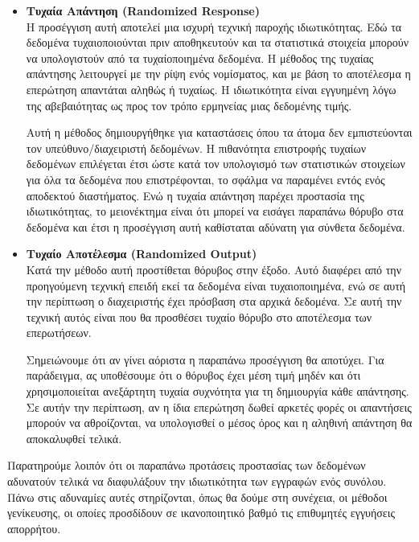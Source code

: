 \begin{itemize}
\item \textbf{Τυχαία Απάντηση (\textlatin{Randomized Response})}\\
Η προσέγγιση αυτή αποτελεί μια ισχυρή τεχνική παροχής ιδιωτικότητας. 
Εδώ τα δεδομένα τυχαιοποιούνται πριν αποθηκευτούν και τα στατιστικά στοιχεία μπορούν να υπολογιστούν από τα τυχαίοποιημένα δεδομένα. Η μέθοδος της τυχαίας απάντησης λειτουργεί με την ρίψη ενός νομίσματος, και με βάση το αποτέλεσμα η επερώτηση απαντάται αληθώς ή τυχαίως. Η ιδιωτικότητα είναι εγγυημένη λόγω της αβεβαιότητας ως προς τον τρόπο ερμηνείας μιας δεδομένης τιμής.

Αυτή η μέθοδος δημιουργήθηκε για καταστάσεις όπου τα άτομα δεν εμπιστεύονται τον υπεύθυνο/διαχειριστή δεδομένων. Η πιθανότητα επιστροφής τυχαίων δεδομένων επιλέγεται έτσι ώστε κατά τον υπολογισμό των στατιστικών στοιχείων για όλα τα δεδομένα που επιστρέφονται, το σφάλμα να παραμένει εντός ενός αποδεκτού διαστήματος. Ενώ η τυχαία απάντηση παρέχει προστασία της ιδιωτικότητας, το μειονέκτημα είναι ότι μπορεί να εισάγει παραπάνω θόρυβο στα δεδομένα και έτσι η προσέγγιση αυτή καθίσταται αδύνατη για σύνθετα δεδομένα.


\item \textbf{Τυχαίο Αποτέλεσμα  (\textlatin{Randomized Output})}\\
Κατά την μέθοδο αυτή προστίθεται θόρυβος στην έξοδο. Αυτό διαφέρει από την προηγούμενη τεχνική επειδή εκεί τα δεδομένα είναι τυχαιοποιημένα, ενώ σε αυτή την περίπτωση ο διαχειριστής έχει πρόσβαση στα αρχικά δεδομένα. Σε αυτή την τεχνική αυτός είναι που θα προσθέσει τυχαίο θόρυβο στο αποτέλεσμα των επερωτήσεων. 

Σημειώνουμε ότι αν γίνει αόριστα η παραπάνω προσέγγιση θα αποτύχει. Για παράδειγμα, ας υποθέσουμε ότι ο θόρυβος έχει μέση τιμή μηδέν και ότι χρησιμοποιείται ανεξάρτητη τυχαία συχνότητα για τη δημιουργία κάθε απάντησης. Σε αυτήν την περίπτωση, αν η ίδια επερώτηση δωθεί αρκετές φορές οι απαντήσεις μπορούν να αθροίζονται, να υπολογισθεί ο μέσος όρος και η αληθινή απάντηση θα αποκαλυφθεί τελικά.


\end{itemize}





Παρατηρούμε λοιπόν ότι οι παραπάνω προτάσεις προστασίας των δεδομένων αδυνατούν τελικά να διαφυλάξουν την ιδιωτικότητα των εγγραφών ενός συνόλου. Πάνω στις αδυναμίες αυτές στηρίζονται, όπως θα δούμε στη συνέχεια, οι μέθοδοι γενίκευσης, οι οποίες προσδίδουν σε ικανοποιητικό βαθμό τις επιθυμητές εγγυήσεις απορρήτου. 



















